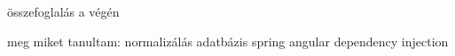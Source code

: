 összefoglalás a végén

meg miket tanultam:
normalizálás adatbázis
spring  angular
dependency injection